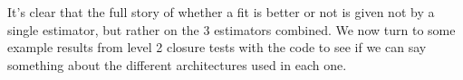 It's clear that the full story of whether a fit is better or not is given not
by a single estimator, but rather on the 3 estimators combined. We now turn to
some example results from level 2 closure tests with the \nfit code to see if we
can say something about the different architectures used in each one.

